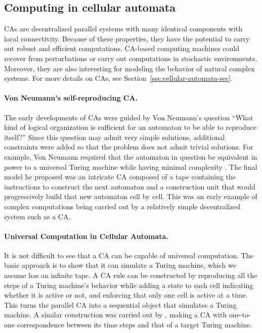 \subsection{Computing in cellular automata}\label{sec:comp-cell-autom}

\Acfp{CA} are decentralized parallel systems with many identical components with
local connectivity. Because of these properties, they have the potential to
carry out robust and efficient computations. \ac{CA}-based computing machines could
recover from perturbations or carry out computations in stochastic environments.
Moreover, they are also interesting for modeling the behavior of natural complex
systems. For more details on \acp{CA}, see Section~\ref{sec:cellular-automata-sec}.

\paragraph{Von Neumann's self-reproducing \ac{CA}.}
The early developments of \acp{CA} were guided by Von Neumann's question ``What
kind of logical organization is sufficient for an automaton to be able to
reproduce itself?'' Since this question may admit very simple solutions,
additional constraints were added so that the problem does not admit trivial
solutions. For example, Von Neumann required that the automaton in question be
equivalent in power to a universal Turing machine while having minimal
complexity \parencite{vonneumannTheorySelfreproducingAutomata1966}. The final
model he proposed was an intricate \ac{CA} composed of a tape containing the
instructions to construct the next automaton and a construction unit that
would progressively build that new automaton cell by cell. This was an early
example of complex computations being carried out by a relatively simple
decentralized system such as a \ac{CA}.

\paragraph{Universal Computation in Cellular Automata.}
It is not difficult to see that a \ac{CA} can be capable of universal
computation. The basic approach is to show that it can simulate a Turing
machine, which we assume has an infinite tape. A \ac{CA} rule can be constructed
by reproducing all the steps of a Turing machine's behavior while adding a state
to each cell indicating whether it is active or not, and enforcing that only one
cell is active at a time. This turns the parallel \ac{CA} into a sequential
object that simulates a Turing machine. A similar construction was carried out
by \parencite{smithSimpleComputationUniversalCellular1971}, making a \ac{CA}
with one-to-one correspondence between its time steps and that of a target
Turing machine.

